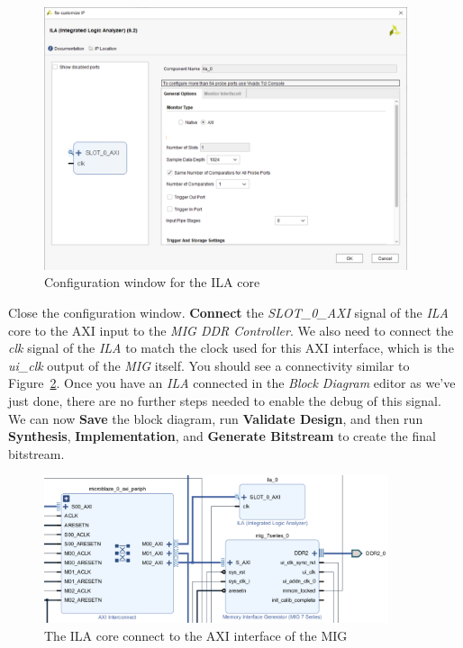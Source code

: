\documentclass[11pt]{article}
\begin{document}
\begin{figure}[!h]
    \centering
    \includegraphics[width=0.95\textwidth]{images/ila_config.png}
    \caption{Configuration window for the ILA core}
    \label{fig:ila_config}
\end{figure}

Close the configuration window. \textbf{Connect} the \textit{SLOT\_0\_AXI} signal of the \textit{ILA} core to the AXI input to the \textit{MIG DDR Controller}. We also need to connect the \textit{clk} signal of the \textit{ILA} to match the clock used for this AXI interface, which is the \textit{ui\_clk} output of the \textit{MIG} itself. You should see a connectivity similar to Figure~\ref{fig:ila_connect}. Once you have an \textit{ILA} connected in the \textit{Block Diagram} editor as we've just done, there are no further steps needed to enable the debug of this signal. We can now \textbf{Save} the block diagram, run \textbf{Validate Design}, and then run \textbf{Synthesis}, \textbf{Implementation}, and \textbf{Generate Bitstream} to create the final bitstream.

\begin{figure}[!h]
    \centering
    \includegraphics[width=0.9\textwidth]{images/ila_connect.png}
    \caption{The ILA core connect to the AXI interface of the MIG}
    \label{fig:ila_connect}
\end{figure}
\end{document}
